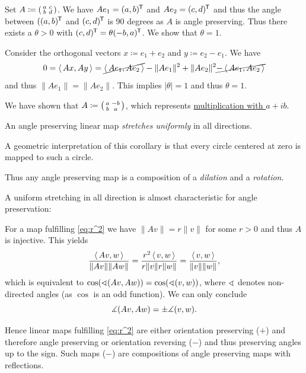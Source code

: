 \documentclass[a4paper,english]{article}
\begin{document}
\begin{pr}
    Set $A \coloneqq \begin{psmallmatrix} a & c \\ b & d \end{psmallmatrix}$.
    We have $A e_1 = (a, b)^{\mkern-1.5mu\mathsf{T}}$ and $A e_2 = (c, d)^{\mkern-1.5mu\mathsf{T}}$ and thus the angle between $((a,b)^{\mkern-1.5mu\mathsf{T}}$ and $(c,d)^{\mkern-1.5mu\mathsf{T}}$ is 90 degrees as $A$ is angle preserving.
    Thus there exists a $\theta > 0$ with $(c, d)^{\mkern-1.5mu\mathsf{T}} = \theta (- b, a)^{\mkern-1.5mu\mathsf{T}}$.
    We show that $\theta = 1$.
    
    Consider the orthogonal vectors $x \coloneqq e_1 + e_2$ and $y \coloneqq e_2 - e_1$.
    We have
    \begin{equation*}
        0 
        = \operatorname{\langle} A x, A y \operatorname{\rangle} 
        = \cancel{\operatorname{\langle} A e_1, A e_2 \operatorname{\rangle}} - \| A e_1 \|^2 + \| A e_2 \|^2 \cancel{- \operatorname{\langle} A e_1, A e_2 \operatorname{\rangle}}
    \end{equation*}
    and thus $\| A e_1 \| = \| A e_2 \|$.
    This implies $| \theta | = 1$ and thus $\theta = 1$.
    
    We have shown that 
    $A \coloneqq \begin{psmallmatrix} a & -b  \\ b & a \end{psmallmatrix}$, which represents \hyperref[defn:CC]{multiplication with $a + i b$}.
\end{pr}

\begin{cor}
    An angle preserving linear map \emph{stretches uniformly} in all directions.
\end{cor}
A geometric interpretation of this corollary is that every circle centered at zero is mapped to such a circle.

Thus any angle preserving map is a composition of a \emph{dilation} and a \emph{rotation}.

\begin{remark}
    A uniform stretching in all direction is almost characteristic for angle preservation:
    
    For a map fulfilling \eqref{eq:r^2} we have $\| A v \| = r \| v \|$ for some $r > 0$ and thus $A$ is injective.
    This yields
    \begin{equation*}
        \frac{\operatorname{\langle} A v, w \operatorname{\rangle}}{\| A v \| \| A w \|}
        = \frac{r^2 \operatorname{\langle} v, w \operatorname{\rangle}}{r \| v \| r \| w \|}
        = \frac{\operatorname{\langle} v, w \operatorname{\rangle}}{\| v \| \| w \|},
    \end{equation*}
    which is equivalent to $\cos(\sphericalangle(A v, A w)) = \cos(\sphericalangle(v, w))$, where $\sphericalangle$ denotes non-directed angles (as $\cos$ is an odd function).
    We can only conclude
    \begin{equation*}
        \measuredangle(A v, A w)
        = \pm \measuredangle(v, w).
    \end{equation*}
    
    Hence linear maps fulfilling \eqref{eq:r^2} are either orientation preserving ($+$) and therefore angle preserving or orientation reversing ($-$) and thus preserving angles up to the sign.
    Such maps ($-$) are compositions of angle preserving maps with reflections.
\end{remark}
\end{document}
